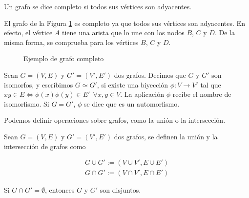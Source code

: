 \begin{defi}
Un grafo se dice completo si todos sus vértices son adyacentes.
\end{defi}

\begin{ejemplo}
El grafo de la Figura \ref{fig:grafo_completo} es completo ya que todos sus vértices son adyacentes. En efecto, el vértice $A$ tiene una arista que lo une con los nodos $B$, $C$ y $D$. De la misma forma, se comprueba para los vértices $B$, $C$ y $D$.

\begin{figure}[htb]
\centering
\ejemplografocompleto
\caption{Ejemplo de grafo completo}
\label{fig:grafo_completo}
\end{figure}

\end{ejemplo}

\begin{defi}
Sean $G = (V,E)$ y $G' = (V',E')$ dos grafos. Decimos que $G$ y $G'$ son isomorfos, y escribimos $G \simeq G'$, si existe una biyección $\phi : V \to V'$ tal que $xy \in E \iff \phi(x)\phi(y) \in E' \ \ \forall x,y \in V$. La aplicación $\phi$ recibe el nombre de isomorfismo. Si $G = G'$, $\phi$ se dice que es un automorfismo. 
\end{defi}

Podemos definir operaciones sobre grafos, como la unión o la intersección.

\begin{defi}
Sean $G = (V,E)$ y $G' = (V',E')$ dos grafos, se definen la unión y la intersección de grafos como

\begin{eqnarray*}
G \cup G' := (V \cup V', E \cup E')\\
G \cap G' := (V \cap V', E \cap E')
\end{eqnarray*}

Si $G \cap G' = \emptyset$, entonces $G$ y $G'$ son disjuntos.
\end{defi}

